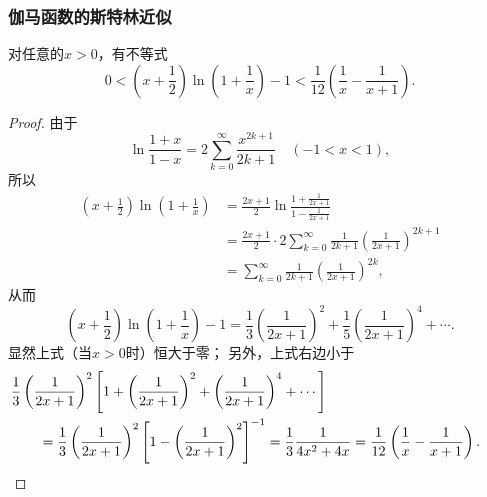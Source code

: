 \subsubsection{伽马函数的斯特林近似}
\begin{lemma}\label{theorem:定积分.伽马函数的斯特灵近似.引理1}
对任意的\(x>0\)，有不等式\begin{equation}\label{equation:定积分.伽马函数的斯特灵近似.引理1}
0 < \left(x+\frac{1}{2}\right) \ln(1+\frac{1}{x}) - 1
< \frac{1}{12}\left(\frac{1}{x}-\frac{1}{x+1}\right).
\end{equation}
\begin{proof}
由于\[
	\ln\frac{1+x}{1-x}
	= 2 \sum\limits_{k=0}^\infty \frac{x^{2k+1}}{2k+1}
	\quad(-1<x<1),
\]
所以\begin{align*}
	\left(x+\frac{1}{2}\right) \ln(1+\frac{1}{x})
	&= \frac{2x+1}{2} \ln\frac{
		1+\frac{1}{2x+1}
	}{
		1-\frac{1}{2x+1}
	} \\
	&= \frac{2x+1}{2} \cdot
	2 \sum\limits_{k=0}^\infty \frac{1}{2k+1} \left(\frac{1}{2x+1}\right)^{2k+1} \\
	&= \sum\limits_{k=0}^\infty \frac{1}{2k+1} \left(\frac{1}{2x+1}\right)^{2k},
\end{align*}
从而\[
	\left(x+\frac{1}{2}\right) \ln(1+\frac{1}{x}) - 1
	= \frac{1}{3} \left(\frac{1}{2x+1}\right)^2
	+ \frac{1}{5} \left(\frac{1}{2x+1}\right)^4
	+ \dotsb.
\]
显然上式（当\(x>0\)时）恒大于零；
另外，上式右边小于\begin{align*}
	&\hspace{-20pt}
	\frac{1}{3} \left(\frac{1}{2x+1}\right)^2 \left[
	1 + \left(\frac{1}{2x+1}\right)^2 + \left(\frac{1}{2x+1}\right)^4 + \dotsb
	\right] \\
	&= \frac{1}{3} \left(\frac{1}{2x+1}\right)^2 \left[
	1 - \left(\frac{1}{2x+1}\right)^2
	\right]^{-1}
	= \frac{1}{3} \frac{1}{4x^2 + 4x}
	= \frac{1}{12} \left(\frac{1}{x} - \frac{1}{x+1}\right).
	\qedhere
\end{align*}
\end{proof}
\end{lemma}

